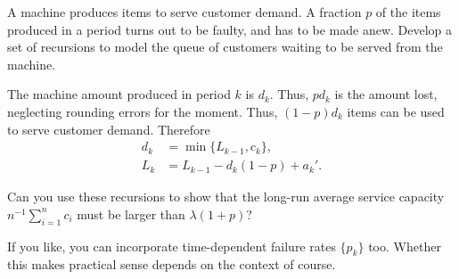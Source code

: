 \begin{extra}
 A machine produces items to serve customer demand.
 A fraction $p$ of the items produced in a period turns out to be faulty, and has to be made anew.
 Develop a set of recursions to model the queue of customers waiting to be served from the machine.
\begin{solution}
 The machine amount produced in period $k$ is $d_k$.
 Thus, $p d_k$ is the amount lost, neglecting rounding errors for the moment.
 Thus, $(1-p)d_k$ items can be used to serve customer demand.
 Therefore
 \begin{align*}
 d_k &= \min\{L_{k-1}, c_k\}, \\
 L_k &= L_{k-1}-d_k(1-p) + a_k'.
 \end{align*}

 Can you use these recursions to show that the long-run average service capacity $n^{-1}\sum_{i=1}^n c_i$ must be larger than $\lambda(1+p)$?

 If you like, you can incorporate time-dependent failure rates $\{p_k\}$ too.
 Whether this makes practical sense depends on the context of course.
\end{solution}
\end{extra}


